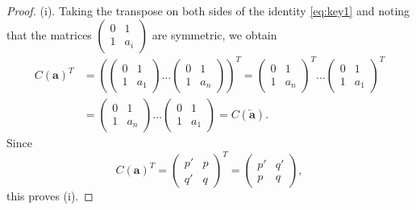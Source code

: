 \documentclass[10pt]{article}
\theoremstyle{definition}
\numberwithin{equation}{section}
\numberwithin{lemma}{section}
\newcommand{\bfa}{\mathbf{a}}
\newcommand{\bfar}{\overleftarrow{\bfa}}
\newcommand{\mat}[1]{\begin{pmatrix} 0 & 1\\ 1 & #1\end{pmatrix}}
\begin{document}
\begin{proof}
(i).
Taking the transpose on both sides of the identity \eqref{eq:key1}
and noting that the matrices $\mat{a_i}$ are symmetric, we obtain
\begin{align*}
C(\bfa)^T&=\left(\mat{a_1}\dots \mat{a_n}\right)^T
=\mat{a_n}^T\dots \mat{a_1}^T
\\
& =\mat{a_n}\dots \mat{a_1} =C(\bfar).
\end{align*}
Since 
\begin{equation*}
C(\bfa)^T=
\begin{pmatrix}p'&p\\q'&q\end{pmatrix}^T
=\begin{pmatrix} p' & q'\\p&q\end{pmatrix},
\end{equation*}
this proves (i).

\medskip


\end{proof}
\end{document}

